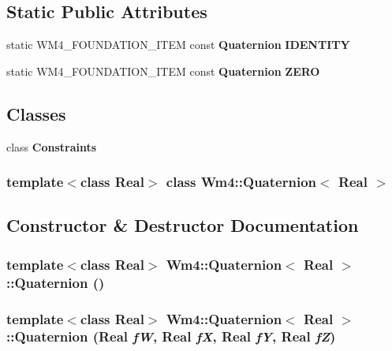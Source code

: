 \subsection*{Static Public Attributes}
\begin{CompactItemize}
\item 
static WM4\_\-FOUNDATION\_\-ITEM const {\bf Quaternion} {\bf IDENTITY}
\item 
static WM4\_\-FOUNDATION\_\-ITEM const {\bf Quaternion} {\bf ZERO}
\end{CompactItemize}
\subsection*{Classes}
\begin{CompactItemize}
\item 
class {\bf Constraints}
\end{CompactItemize}
\subsubsection*{template$<$class Real$>$ class Wm4::Quaternion$<$ Real $>$}



\subsection{Constructor \& Destructor Documentation}
\subsubsection{\setlength{\rightskip}{0pt plus 5cm}template$<$class Real$>$ {\bf Wm4::Quaternion}$<$ Real $>$::{\bf Quaternion} ()}\label{classWm4_1_1Quaternion_32466e45ed91a1f6aee0ab4024ebbfdf}


\subsubsection{\setlength{\rightskip}{0pt plus 5cm}template$<$class Real$>$ {\bf Wm4::Quaternion}$<$ Real $>$::{\bf Quaternion} (Real {\em f\-W}, Real {\em f\-X}, Real {\em f\-Y}, Real {\em f\-Z})}\label{classWm4_1_1Quaternion_4e41b6dc90db1e5bc27393944c1d419f}



